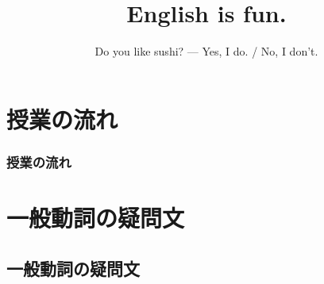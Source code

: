 \documentclass[aspectratio=169,dvipsnames]{beamer}
\title{English is fun.}
\subtitle{Do you like sushi? --- Yes, I do. / No, I don't.}
\author{}
\institute[]{}
\date[]
\begin{document}
\begin{frame}[plain]
  \titlepage
\end{frame}

\section*{授業の流れ}
\begin{frame}[plain]
  \frametitle{授業の流れ}
  \tableofcontents
\end{frame}

\section{一般動詞の疑問文}
\subsection{一般動詞の疑問文}
\end{document}
